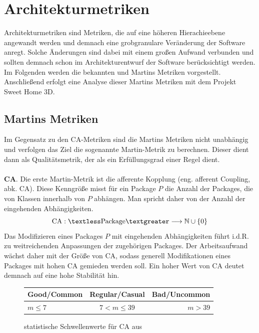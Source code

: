 \documentclass[12pt]{article}
\begin{document}
\section{Architekturmetriken}\label{archm}

Architekturmetriken sind Metriken, die auf eine höheren
Hierachieebene angewandt werden und demnach eine grobgranulare
Veränderung der Software anregt. Solche Änderungen sind dabei mit
einem großen Aufwand verbunden und sollten demnach schon im
Architekturentwurf der Software berücksichtigt werden.  Im
Folgenden werden die bekannten und Martins Metriken vorgestellt.
Anschließend erfolgt eine Analyse dieser Martins Metriken mit dem
Projekt Sweet Home 3D.

\subsection{Martins Metriken}
Im Gegensatz zu den CA-Metriken sind die Martins Metriken nicht
unabhängig und verfolgen das Ziel die sogenannte Martin-Metrik zu
berechnen. Dieser dient dann als Qualitätsmetrik, der als ein
Erfüllungsgrad einer Regel dient.
~\\
\\
\textbf{CA}.\label{CA} Die erste Martin-Metrik ist die afferente Kopplung (eng. afferent
Coupling, abk. CA).
Diese Kenngröße misst für ein Package $P$ die Anzahl der Packages,
die von Klassen innerhalb von $P$ abhängen. Man spricht daher von
der Anzahl der eingehenden Abhängigkeiten.
\[
        \text{CA}: \textless \text{Package} \textgreater
        \longrightarrow \mathbb{N} \cup \left\{ 0 \right\} 
\]
Das Modifizieren eines Packages $P$ mit eingehenden
Abhängigkeiten führt i.d.R. zu weitreichenden Anpassungen der
zugehörigen Packages. Der Arbeitsaufwand wächst daher mit der Größe von
CA, sodass generell Modifikationen eines Packages mit hohen CA
gemieden werden soll.  Ein hoher Wert von CA deutet demnach auf
eine hohe Stabilität hin.

\begin{figure}[H]
\centering
 \begin{tabular}{lcr}
    \toprule
    Good/Common & Regular/Casual & Bad/Uncommon \\
    \midrule
    $m \leq 7$ & $7 < m \leq 39$ & $m > 39$ \\
    \bottomrule
  \end{tabular}
  \caption[Caption for LOF]{statistische Schwellenwerte für CA
          \protect\footnotemark aus \cite{Fil15}}
  \label{tab:cathreshold}
\end{figure}
\end{document}
